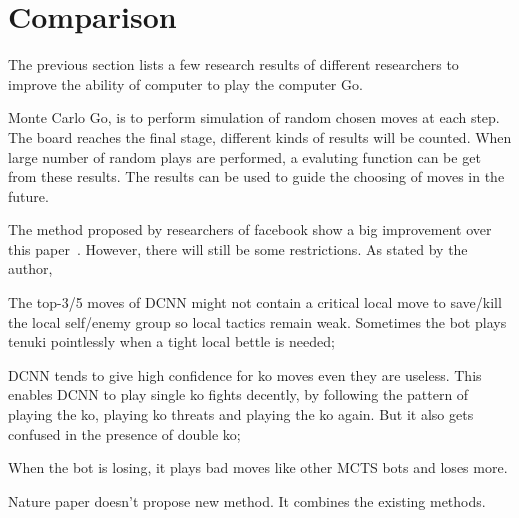 \section{Comparison}
The previous section lists a few research results of different researchers to improve the ability of computer to play the computer Go. 

Monte Carlo Go, is to perform simulation of random chosen moves at each step. The board reaches the final stage, different kinds of results will be counted. When large number of random plays are performed, a evaluting function can be get from these results. The results can be used to guide the choosing of moves in the future.

The method proposed by researchers of facebook show a big improvement over this paper~\cite{sutskever2008mimicking}. However, there will still be some restrictions. As stated by the author, 
\begin{inparaenum}
	\item The top-3/5 moves of DCNN might not contain a critical local move to save/kill the local self/enemy group so local tactics remain weak. Sometimes the bot plays tenuki pointlessly when a tight local bettle is needed;
	\item DCNN tends to give high confidence for ko moves even they are useless. This enables DCNN to play single ko fights decently, by following the pattern of playing the ko, playing ko threats and playing the ko again. But it also gets confused in the presence of double ko;
	\item When the bot is losing, it plays bad moves like other MCTS bots and loses more.

Nature paper doesn't propose new method. It combines the existing methods.
\end{inparaenum}
